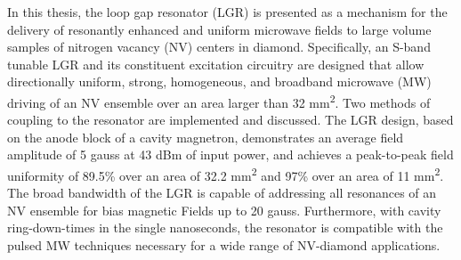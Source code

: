% 
% 
%


In this thesis, the loop gap resonator (LGR) is presented as a mechanism for the delivery of resonantly enhanced and uniform microwave fields to large volume samples of nitrogen vacancy (NV) centers in diamond. Specifically, an S-band tunable LGR and its constituent excitation circuitry are designed that allow directionally uniform, strong, homogeneous, and broadband
microwave (MW) driving of an NV ensemble over an area larger than 32 mm\textsuperscript{2}. Two methods of coupling to the resonator are implemented and discussed. The LGR design, based on the anode
block of a cavity magnetron, demonstrates an average field amplitude of 5 gauss at 43 dBm of input power, and achieves a peak-to-peak
field uniformity of 89.5\% over an area of 32.2 mm\textsuperscript{2} and 97\% over an area of 11 mm\textsuperscript{2}. The broad bandwidth of the LGR is capable of addressing all resonances of an NV ensemble for bias magnetic Fields up to 20 gauss. Furthermore, with cavity
ring-down-times in the single nanoseconds, the resonator is compatible with the pulsed MW techniques necessary for a wide range of NV-diamond
applications.

